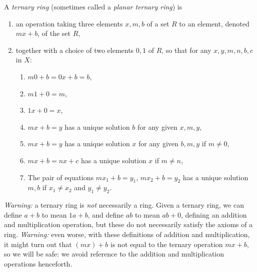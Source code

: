 A \emph{ternary ring} (sometimes called a \emph{planar ternary ring}) is 
\begin{enumerate}
\item
an operation taking three elements \(x,m,b\) of a set \(R\) to an element, denoted \(mx+b\), of the set \(R\), 
\item
together with a choice of two elements \(0,1\) of \(R\), so that for any \(x,y,m,n,b,c\) in \(X\):
\begin{enumerate}
\item\label{enum:A} \(m0+b=0x+b=b\),
\item \(m1+0=m\),
\item \(1x+0=x\),
\item \(mx+b=y\) has a unique solution \(b\) for any given \(x,m,y\),
\item \(mx+b=y\) has a unique solution \(x\) for any given \(b,m,y\) if \(m \ne 0\),
\item \(m x+b = n x + c\) has a unique solution \(x\) if \(m \ne n\),
\item The pair of equations \(m x_1 + b = y_1\), \(m x_2 + b = y_2\) has a unique solution \(m,b\) if \(x_1 \ne x_2\) and \(y_1 \ne y_2\).
\end{enumerate}
\end{enumerate}

\emph{Warning:} a ternary ring is \emph{not} necessarily a ring.
Given a ternary ring, we can define \(a+b\) to mean \(1a+b\), and define \(ab\) to mean \(ab+0\), defining an addition and multiplication operation, but these do not necessarily satisfy the axioms of a ring.
\emph{Warning:} even worse, with these definitions of addition and multiplication, it might turn out that \((mx)+b\) is not equal to the ternary operation \(mx+b\), so we will be safe: we avoid reference to the addition and multiplication operations henceforth.

